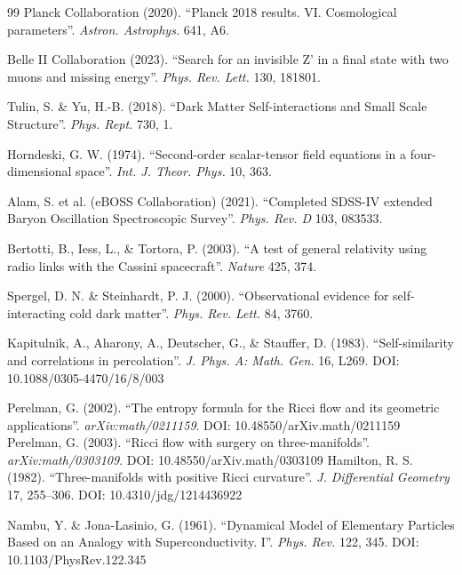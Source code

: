 \documentclass[a4paper,12pt]{article}
\begin{document}
\begin{thebibliography}{99}
 Planck Collaboration (2020). ``Planck 2018 results. VI. Cosmological parameters''. \textit{Astron. Astrophys.} 641, A6.

 Belle II Collaboration (2023). ``Search for an invisible Z' in a final state with two muons and missing energy''. \textit{Phys. Rev. Lett.} 130, 181801.

 Tulin, S. \& Yu, H.-B. (2018). ``Dark Matter Self-interactions and Small Scale Structure''. \textit{Phys. Rept.} 730, 1.

 Horndeski, G. W. (1974). ``Second-order scalar-tensor field equations in a four-dimensional space''. \textit{Int. J. Theor. Phys.} 10, 363.

 Alam, S. et al. (eBOSS Collaboration) (2021). ``Completed SDSS-IV extended Baryon Oscillation Spectroscopic Survey''. \textit{Phys. Rev. D} 103, 083533.


 Bertotti, B., Iess, L., \& Tortora, P. (2003). ``A test of general relativity using radio links with the Cassini spacecraft''. \textit{Nature} 425, 374.

 Spergel, D. N. \& Steinhardt, P. J. (2000). ``Observational evidence for self-interacting cold dark matter''. \textit{Phys. Rev. Lett.} 84, 3760.

 Kapitulnik, A., Aharony, A., Deutscher, G., \& Stauffer, D. (1983). ``Self-similarity and correlations in percolation''. \textit{J. Phys. A: Math. Gen.} 16, L269. DOI: 10.1088/0305-4470/16/8/003


 Perelman, G. (2002). ``The entropy formula for the Ricci flow and its geometric applications''. \textit{arXiv:math/0211159}. DOI: 10.48550/arXiv.math/0211159
 Perelman, G. (2003). ``Ricci flow with surgery on three-manifolds''. \textit{arXiv:math/0303109}. DOI: 10.48550/arXiv.math/0303109
 Hamilton, R. S. (1982). ``Three-manifolds with positive Ricci curvature''. \textit{J. Differential Geometry} 17, 255--306. DOI: 10.4310/jdg/1214436922

 Nambu, Y. \& Jona-Lasinio, G. (1961). ``Dynamical Model of Elementary Particles Based on an Analogy with Superconductivity. I''. \textit{Phys. Rev.} 122, 345. DOI: 10.1103/PhysRev.122.345


\end{thebibliography}
\end{document}
